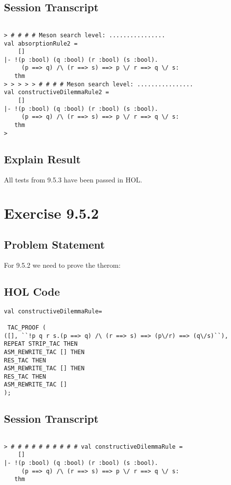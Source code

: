 \documentclass{report}
\begin{document}
\section{Session Transcript}
\label{Session Trans 953}
\setcounter{sessioncount}{0}
\begin{session}
  \begin{scriptsize}
\begin{verbatim}

> # # # # Meson search level: ................
val absorptionRule2 =
    []
|- !(p :bool) (q :bool) (r :bool) (s :bool).
     (p ==> q) /\ (r ==> s) ==> p \/ r ==> q \/ s:
   thm
> > > > > # # # # Meson search level: ................
val constructiveDilemmaRule2 =
    []
|- !(p :bool) (q :bool) (r :bool) (s :bool).
     (p ==> q) /\ (r ==> s) ==> p \/ r ==> q \/ s:
   thm
>
\end{verbatim}
  \end{scriptsize}
\end{session}
\section{Explain Result}
\label{explain result 953}
All tests from 9.5.3 have been passed in HOL.

\chapter{Exercise 9.5.2}
\label{ex 952}

\section{Problem Statement}
\label{problem state 952}
For 9.5.2 we need to prove the therom:


\section{HOL Code}
\label{HOl Code 952}

\begin{lstlisting}[frame=trBL]
val constructiveDilemmaRule=

 TAC_PROOF (
([], ``!p q r s.(p ==> q) /\ (r ==> s) ==> (p\/r) ==> (q\/s)``),
REPEAT STRIP_TAC THEN
ASM_REWRITE_TAC [] THEN
RES_TAC THEN
ASM_REWRITE_TAC [] THEN
RES_TAC THEN
ASM_REWRITE_TAC []
);

\end{lstlisting}

\section{Session Transcript}
\label{Session Trans 952}
\setcounter{sessioncount}{0}
\begin{session}
  \begin{scriptsize}
\begin{verbatim}

> # # # # # # # # # # val constructiveDilemmaRule =
    []
|- !(p :bool) (q :bool) (r :bool) (s :bool).
     (p ==> q) /\ (r ==> s) ==> p \/ r ==> q \/ s:
   thm
\end{verbatim}
  \end{scriptsize}
\end{session}
\end{document}
